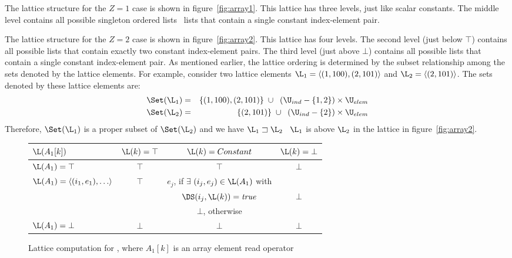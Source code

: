 The lattice structure for the $Z=1$ case is shown in figure~\ref{fig:array1}.  This lattice has three levels, just like scalar constants.  The middle level contains all possible singleton
ordered lists \ie\ lists  that contain a single constant index-element pair.

The lattice structure for the $Z=2$ case is shown in figure~\ref{fig:array2}.  This lattice has four levels.  The second level (just below $\top$)
contains all possible 
lists that contain exactly two constant index-element pairs.  The third level (just above $\bot$) contains all possible 
lists that contain a single constant index-element pair.  
As mentioned earlier,
the lattice ordering is determined by the subset relationship among the sets denoted by the lattice elements.  For example, consider two lattice elements $\L_1 = \langle(1,100), (2,101)\rangle$ and $\L_2 = \langle(2,101)\rangle$.  The sets denoted by these lattice elements are:
\begin{eqnarray*}
\Set(\L_1) & = & \{(1,100), (2, 101)\} \;\cup\;\;
(\U_{ind} - \{1,2\}) \times \U_{elem} \\
\Set(\L_2) & = & \{(2, 101)\} \;\cup\;\;
(\U_{ind} - \{2\}) \times \U_{elem}
\end{eqnarray*}
Therefore, $\Set(\L_1)$ is a proper subset of $\Set(\L_2)$ and we have $\L_1 \sqsupset \L_2$ \ie\ $\L_1$ is above $\L_2$ in the lattice in figure~\ref{fig:array2}.


\begin{figure}%
\begin{center}
\begin{tabular}{|l||c|c|c|}
\hline
$\L(A_1[k])$ & $\L(k) = \top$ & $\L(k) = Constant$ & $\L(k) = \bot$ \\
\hline \hline
$\L(A_1) = \top$ & $\top$ & $\top$ & $\bot$ \\
\hline
$\L(A_1) = \langle (i_1,e_1), \ldots \rangle$ & $\top$ & $e_j$, 
if $\exists$
$(i_j,e_j) \in \L(A_1)$ with &\\
& & $\DS(i_j, \L(k)) = \mbox{\it true}$ & $\bot$\\
& & $\bot$, otherwise & \\
\hline
$\L(A_1) = \bot$ & $\bot$ & $\bot$ & $\bot$ \\
\hline
\end{tabular}
\end{center}
\caption{Lattice computation for ,
where $A_1[k]$ is an 
array element read operator}
\label{fig:aref}
\end{figure}

